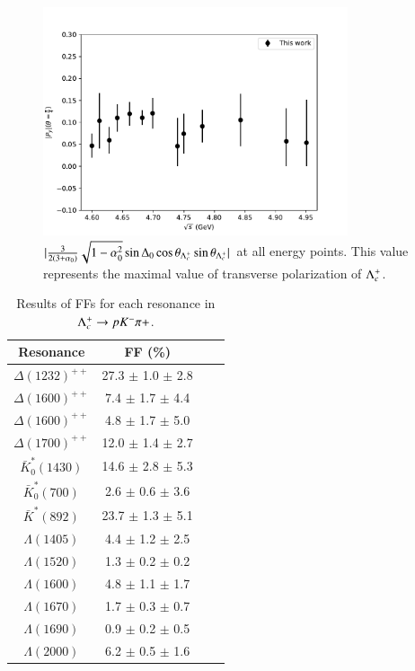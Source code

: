 \begin{figure}\centering
    \includegraphics[width=0.80\textwidth]{figure/summary/max_Py.pdf}
    \caption{$| \frac{3}{2(3+\alpha_0)}\sqrt{1-\alpha_0^2}\sin\Delta_0\cos\theta_{\Lambda_{c}^{+}}\sin\theta_{\Lambda_{c}^{+}}|$ at all energy points. This value represents the maximal value of transverse polarization of $\Lambda_{c}^{+}$.}
\label{fig:max_py}
\end{figure}

\begin{table}[H]
    \centering
    \caption{Results of FFs for each resonance in $\Lambda_{c}^{+} \rightarrow p K^-\pi+$.}
    \label{tab:final-ff}
    \begin{tabular}{cccc}
    \hline\hline
    Resonance & FF (\%) \\\hline
    $ \Delta(1232)^{++} $ & 27.3 $\pm$ 1.0 $\pm$ 2.8 \\
    $ \Delta(1600)^{++} $ & 7.4 $\pm$ 1.7 $\pm$ 4.4 \\
    $ \Delta(1600)^{++} $ & 4.8 $\pm$ 1.7 $\pm$ 5.0 \\
    $ \Delta(1700)^{++} $ & 12.0 $\pm$ 1.4 $\pm$ 2.7 \\
    $ \bar{K}_{0}^{*}(1430) $ & 14.6 $\pm$ 2.8 $\pm$ 5.3 \\
    $ \bar{K}_{0}^{*}(700) $ & 2.6 $\pm$ 0.6 $\pm$ 3.6 \\
    $ \bar{K}^{*}(892) $ & 23.7 $\pm$ 1.3 $\pm$ 5.1 \\
    $ \Lambda(1405) $ & 4.4 $\pm$ 1.2 $\pm$ 2.5 \\
    $ \Lambda(1520) $ & 1.3 $\pm$ 0.2 $\pm$ 0.2 \\
    $ \Lambda(1600) $ & 4.8 $\pm$ 1.1 $\pm$ 1.7 \\
    $ \Lambda(1670) $ & 1.7 $\pm$ 0.3 $\pm$ 0.7 \\
    $ \Lambda(1690) $ & 0.9 $\pm$ 0.2 $\pm$ 0.5 \\
    $ \Lambda(2000) $ & 6.2 $\pm$ 0.5 $\pm$ 1.6 \\
\hline\hline
    \end{tabular}
\end{table}

